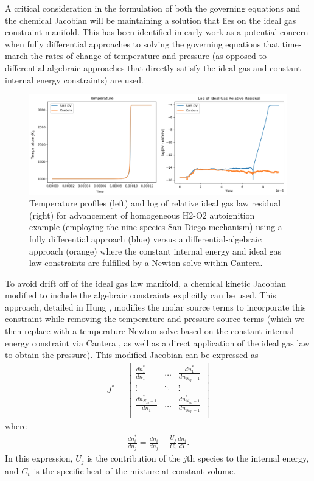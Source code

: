 A critical consideration in the formulation of both the governing equations
and the chemical Jacobian will be maintaining a solution
that lies on the ideal gas constraint manifold. This
has been identified in early work as a potential concern when fully
differential approaches to solving the governing equations that time-march
the rates-of-change of temperature and pressure (as opposed to
differential-algebraic approaches that directly satisfy the ideal gas and
constant internal energy constraints) are used.
\begin{figure}
\centering
\includegraphics[width=0.8\linewidth,trim=4 4 4 4,clip]{figures/autoignition_drift.png}
	\caption{Temperature profiles (left) and log of relative ideal gas law residual (right)
		 for advancement of homogeneous H2-O2 autoignition example (employing the nine-species
		 San Diego mechanism) using a fully differential approach (blue) versus a differential-algebraic
		 approach (orange) where the constant internal energy and ideal gas law constraints are fulfilled
		 by a Newton solve within Cantera.}
\label{fig:autoignition_drift}
\end{figure}
To avoid drift off of the ideal gas law manifold, a chemical
kinetic Jacobian modified to include the algebraic constraints explicitly can
be used. This approach, detailed in Hung \cite{hung2003algorithms}, modifies the molar source terms to incorporate
this constraint while removing the temperature and pressure source terms (which
we then replace with a temperature Newton solve based on the constant internal
energy constraint via Cantera \cite{cantera}, as well as a direct application of the ideal
gas law to obtain the pressure). This modified Jacobian can be expressed as
\begin{align}
J^{*} = \begin{bmatrix}	\frac{d\dot{n}_{1}^{*}}{dn_{1}} & \hdots & \frac{d\dot{n}_{1}^{*}}{dn_{N_{sp}-1}} \\
	                \vdots & \ddots & \vdots \\
	                \frac{d\dot{n}_{N_{sp}-1}^{*}}{dn_{1}} & \hdots & \frac{d\dot{n}_{N_{sp}-1}^{*}}{dn_{N_{sp}-1}} \\
    \end{bmatrix}
\end{align}
where
\begin{align}
\frac{d\dot{n}_{i}^{*}}{dn_{j}} = \frac{d\dot{n}_{i}}{dn_{j}} - \frac{U_{j}}{C_{v}}\frac{d\dot{n}_{i}}{dT}.
\end{align}
In this expression, $U_{j}$ is the contribution of the $j$th species to the
internal energy, and $C_{v}$ is the specific heat of the mixture at constant
volume.

